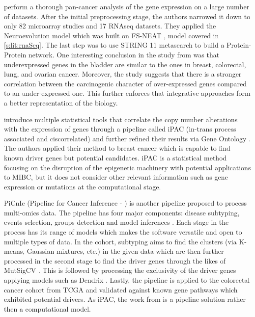 \citet{Feltes2020-bz} perform a thorough pan-cancer analysis of the gene expression on a large number of datasets. After the initial preprocessing stage, the authors narrowed it down to only 82 microarray studies and 17 RNAseq datasets. They applied the Neuroevolution model \citep{Grisci2019-xn} which was built on FS-NEAT \citep{Whiteson2005-dn}, model covered in \cref{s:lit:rnaSeq}. The last step was to use STRING 11 \citep{Szklarczyk2019-pu} metasearch to build a Protein-Protein network. One interesting conclusion in the study from \citet{Feltes2020-bz} was that underexpressed genes in the bladder are similar to the ones in breast, colorectal, lung, and ovarian cancer. Moreover, the study suggests that there is a stronger correlation between the carcinogenic character of over-expressed genes compared to an under-expressed one. This further enforces that integrative approaches form a better representation of the biology.

\citet{Aure2013-je} introduce multiple statistical tools that correlate the copy number alterations with the expression of genes through a pipeline called iPAC (in-trans process associated and ciscorrelated) and further refined their results via Gene Ontology \citep{Carbon2018-ah}. The authors applied their method to breast cancer which is capable to find known driver genes but potential candidates. iPAC is a statistical method focusing on the disruption of the epigenetic machinery with potential applications to MIBC, but it does not consider other relevant information such as gene expression or mutations at the computational stage.


PiCnIc (Pipeline for Cancer Inference - \cite{Caravagna2016-vw}) is another pipeline proposed to process multi-omics data. The pipeline has four major components: disease subtyping, events selection, groups detection and model inferences \citep{Caravagna2016-vw}. Each stage in the process has its range of models which makes the software versatile and open to multiple types of data. In the cohort, subtyping aims to find the clusters (via K-means, Gaussian mixtures, etc.) in the given data which are then further processed in the second stage to find the driver genes through the likes of MutSigCV \citep{Lawrence2013-pl}. This is followed by processing the exclusivity of the driver genes applying models such as Dendrix \citep{Vandin2012-cf, Zhao2012-wj}. Lastly, the pipeline is applied to the colorectal cancer cohort from TCGA and validated against known gene pathways which exhibited potential drivers. As iPAC, the work from \cite{Caravagna2016-vw} is a pipeline solution rather then a computational model.

